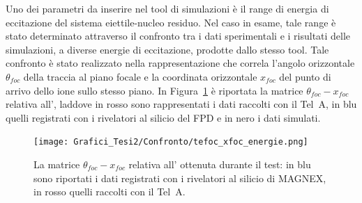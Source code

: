 
Uno dei parametri da inserire nel tool di simulazioni è il range di energia di eccitazione del sistema eiettile-nucleo residuo.
Nel caso in esame, tale range è stato determinato attraverso il confronto tra i dati sperimentali e i risultati delle simulazioni, a diverse energie di eccitazione, prodotte dallo stesso tool.
Tale confronto è stato realizzato nella rappresentazione che correla l'angolo orizzontale $\theta_{foc}$ della traccia al piano focale e la coordinata orizzontale $x_{foc}$ del punto di arrivo dello ione sullo stesso piano.
In Figura~\ref{fig:tefoc_xfoc} è riportata la matrice $\theta_{foc} - x_{foc}$ relativa all', laddove in rosso sono rappresentati i dati raccolti con il Tel~A, in blu quelli registrati con i rivelatori al silicio del FPD e in nero i dati simulati.











\begin{figure} [!p]
	\centering
	\texttt{[image: Grafici\_Tesi2/Confronto/tefoc\_xfoc\_energie.png]}
	\caption{La matrice $\theta_{foc} - x_{foc}$ relativa all' ottenuta durante il test: in blu sono riportati i dati registrati con i rivelatori al silicio di MAGNEX, in rosso quelli raccolti con il Tel~A.} \label{fig:tefoc_xfoc}
\end{figure}








